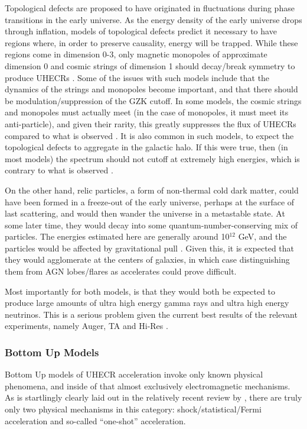 Topological defects are proposed to have originated in fluctuations during phase transitions in the early universe. As the energy density of the early universe drops through inflation, models of topological defects predict it necessary to have regions where, in order to preserve causality, energy will be trapped. While these regions come in dimension 0-3, only magnetic monopoles of approximate dimension 0 and cosmic strings of dimension 1 should decay/break symmetry to produce UHECRs \cite{stanev}. Some of the issues with such models include that the dynamics of the strings and monopoles become important, and that there should be modulation/suppression of the GZK cutoff. In some models, the cosmic strings and monopoles must actually meet (in the case of monopoles, it must meet its anti-particle), and given their rarity, this greatly suppresses the flux of UHECRs compared to what is observed \cite{tds}. It is also common in such models, to expect the topological defects to aggregate in the galactic halo. If this were true, then (in most models) the spectrum should not cutoff at extremely high energies, which is contrary to what is observed \cite{swordyplot}.

On the other hand, relic particles, a form of non-thermal cold dark matter, could have been formed in a freeze-out of the early universe, perhaps at the surface of last scattering, and would then wander the universe in a metastable state. At some later time, they would decay into some quantum-number-conserving mix of particles. The energies estimated here are generally around 10$^{12}$ GeV, and the particles would be affected by gravitational pull \cite{tds,stanev}. Given this, it is expected that they would agglomerate at the centers of galaxies, in which case distinguishing them from AGN lobes/flares as accelerates could prove difficult. 

Most importantly for both models, is that they would both be expected to produce large amounts of ultra high energy gamma rays and ultra high energy neutrinos. This is a serious problem given the current best results of the relevant experiments, namely Auger, TA and Hi-Res \cite{futuregzk,foteini}. 
\subsubsection{Bottom Up Models}
\label{bottomups}
Bottom Up models of UHECR acceleration invoke only known physical phenomena, and inside of that almost exclusively electromagnetic mechanisms. As is startlingly clearly laid out in the relatively recent review by \textcite{stanev}, there are truly only two physical mechanisms in this category: shock/statistical/Fermi acceleration and so-called ``one-shot'' acceleration. 

